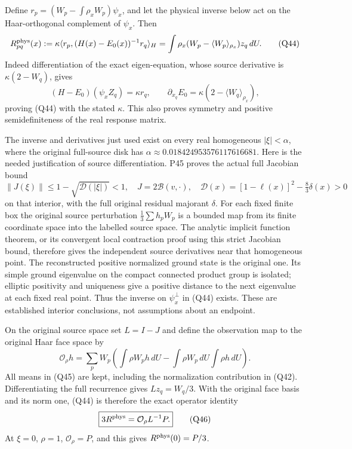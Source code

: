 \documentclass[11pt]{article}
\begin{document}
Define \(r_p=(W_p-\int\rho_xW_p)\psi_x\), and let the physical inverse below act on the Haar-orthogonal complement of \(\psi_x\). Then
\[
 R^{\rm phys}_{pq}(x)
 :=\kappa\langle r_p,(H(x)-E_0(x))^{-1}r_q\rangle_H
 =\int\rho_x(W_p-\langle W_p\rangle_{\rho_x})z_q\,dU .
 \tag{Q44}
\]
Indeed differentiation of the exact eigen-equation, whose source derivative is \(\kappa(2-W_q)\), gives
\[
 (H-E_0)(\psi_xZ_q)=\kappa r_q,\qquad
 \partial_{x_q}E_0=\kappa(2-\langle W_q\rangle_{\rho_x}),
\]
proving (Q44) with the stated \(\kappa\). This also proves symmetry and positive semidefiniteness of the real response matrix.

The inverse and derivatives just used exist on every real homogeneous \(|\xi|<\alpha\), where the original full-source disk has
\(\alpha\approx0.018424953576117616681\). Here is the needed justification of source differentiation. P45 proves the actual full Jacobian bound
\[
 \|J(\xi)\|\le1-\sqrt{\mathscr D(|\xi|)}<1,\quad
 J=2\mathcal B(v,\cdot),\quad
 \mathscr D(x)=[1-\ell(x)]^2-\tfrac83\delta(x)>0
\]
on that interior, with the full original residual majorant \(\delta\). For each fixed finite box the original source perturbation \(\frac13\sum h_pW_p\) is a bounded map from its finite coordinate space into the labelled source space. The analytic implicit function theorem, or its convergent local contraction proof using this strict Jacobian bound, therefore gives the independent source derivatives near that homogeneous point. The reconstructed positive normalized ground state is the original one. Its simple ground eigenvalue on the compact connected product group is isolated; elliptic positivity and uniqueness give a positive distance to the next eigenvalue at each fixed real point. Thus the inverse on \(\psi_x^\perp\) in (Q44) exists. These are established interior conclusions, not assumptions about an endpoint.

On the original source space set \(L=I-J\) and define the observation map to the original Haar face space by
\[
 \mathcal O_{\rho}h
 =\sum_p W_p\left(\int\rho W_ph\,dU
                      -\int\rho W_p\,dU\int\rho h\,dU\right).
 \tag{Q45}
\]
All means in (Q45) are kept, including the normalization contribution in (Q42). Differentiating the full recurrence gives \(Lz_q=W_q/3\). With the original face basis and its norm one, (Q44) is therefore the exact operator identity
\[
 \boxed{3R^{\rm phys}=\mathcal O_\rho L^{-1}P.}\tag{Q46}
\]
At \(\xi=0\), \(\rho=1\), \(\mathcal O_\rho=P\), and this gives \(R^{\rm phys}(0)=P/3\).
\end{document}
